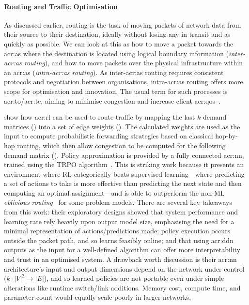 \paragraph{Routing and Traffic Optimisation}
As discussed earlier, routing is the task of moving packets of network data from their source to their destination, ideally without losing any in transit and as quickly as possible.
We can look at this as how to move a packet towards the \gls{acr:as} where the destination is located using logical boundary information (\emph{inter-\gls{acr:as} routing}), and how to move packets over the physical infrastructure within an \gls{acr:as} (\emph{intra-\gls{acr:as} routing}).
As inter-\gls{acr:as} routing requires consistent protocols and negotiation between organisations, intra-\gls{acr:as} routing offers more scope for optimisation and innovation.
The usual term for such processes is \gls{acr:to}/\gls{acr:te}, aiming to minimise congestion and increase client \gls{acr:qos}~\parencite{rfc3272}.

\textcite{DBLP:conf/hotnets/ValadarskySST17} show how \gls{acr:rl} can be used to route traffic by mapping the last $k$ demand matrices (\rllitstate) into a set of edge weights (\rllitactreal).
The calculated weights are used as the input to compute probabilistic forwarding strategies based on classical hop-by-hop routing, which then allow congestion to be computed for the following demand matrix (\rllitreward).
Policy approximation is provided by a fully connected \gls{acr:nn}, trained using the TRPO algorithm~\parencite{DBLP:conf/icml/SchulmanLAJM15}.
This is striking work because it presents an environment where RL categorically beats supervised learning---where predicting a set of actions to take is more effective than predicting the next state and then computing an optimal assignment---and is able to outperform the non-ML \emph{oblivious routing}~\parencite{DBLP:conf/stoc/AzarCFKR03} for some problem models.
There are several key takeaways from this work: their exploratory designs showed that system performance and learning rate rely heavily upon output model size, emphasising the need for a minimal representation of actions/predictions made; policy execution occurs outside the packet path, and so learns feasibly online; and that using \gls{acr:ddn} outputs as the input for a well-defined algorithm can offer more interpretability and trust in an optimised system.
A drawback worth discussion is their \gls{acr:nn} architecture's input and output dimensions depend on the network under control ($k\cdot\left|V\right|^2\rightarrow\left|E\right|$), and so learned policies are not portable even under simple alterations like runtime switch/link additions.
Memory cost, compute time, and parameter count would equally scale poorly in larger networks.

